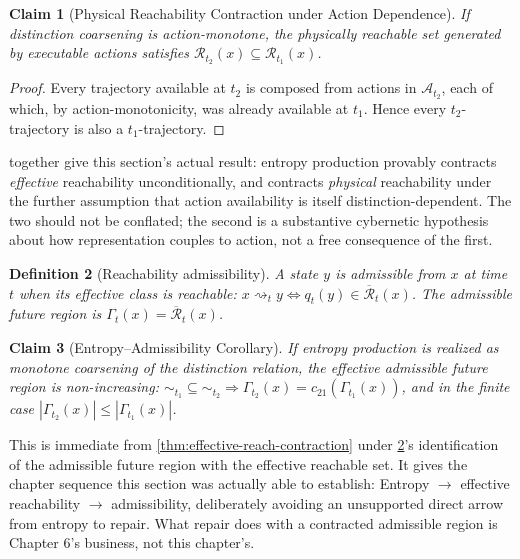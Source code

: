 \documentclass[12pt]{report}
\newtheorem{definition}{Definition}[section]
\newtheorem{claim}[definition]{Claim}
\begin{document}
\begin{claim}[Physical Reachability Contraction under Action Dependence]
\label{thm:physical-contraction}
If distinction coarsening is action-monotone, the physically reachable
set generated by executable actions satisfies $\mathcal{R}_{t_2}(x)
\subseteq \mathcal{R}_{t_1}(x)$.
\end{claim}

\begin{proof}
Every trajectory available at $t_2$ is composed from actions in
$\mathcal{A}_{t_2}$, each of which, by action-monotonicity, was already
available at $t_1$. Hence every $t_2$-trajectory is also a
$t_1$-trajectory.
\end{proof}

 together
give this section's actual result: entropy production provably contracts
\emph{effective} reachability unconditionally, and contracts
\emph{physical} reachability under the further assumption that action
availability is itself distinction-dependent. The two should not be
conflated; the second is a substantive cybernetic hypothesis about how
representation couples to action, not a free consequence of the first.

\begin{definition}[Reachability admissibility]
\label{def:reach-admissibility}
A state $y$ is admissible from $x$ at time $t$ when its effective class
is reachable: $x \rightsquigarrow_t y \iff q_t(y) \in
\overline{\mathcal{R}}_t(x)$. The admissible future region is
$\Gamma_t(x) = \overline{\mathcal{R}}_t(x)$.
\end{definition}

\begin{claim}[Entropy--Admissibility Corollary]
\label{cor:entropy-admissibility}
If entropy production is realized as monotone coarsening of the
distinction relation, the effective admissible future region is
non-increasing: $\sim_{t_1} \subseteq \sim_{t_2} \Rightarrow \Gamma_{t_2}(x)
= c_{21}(\Gamma_{t_1}(x))$, and in the finite case $|\Gamma_{t_2}(x)| \leq
|\Gamma_{t_1}(x)|$.
\end{claim}

This is immediate from \cref{thm:effective-reach-contraction} under
\cref{def:reach-admissibility}'s identification of the admissible future
region with the effective reachable set. It gives the chapter sequence
this section was actually able to establish: Entropy $\to$ effective
reachability $\to$ admissibility, deliberately avoiding an unsupported
direct arrow from entropy to repair. What repair does with a contracted
admissible region is Chapter 6's business, not this chapter's.
\end{document}
